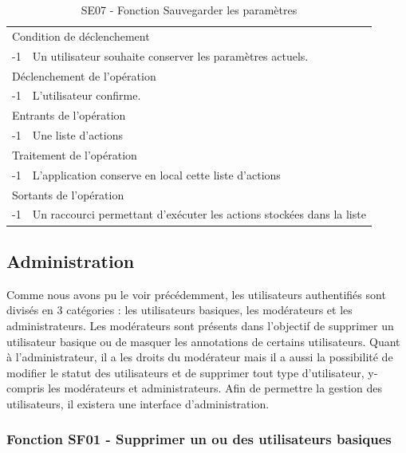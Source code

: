 \documentclass[a4paper]{article}
\begin{document}
\begin{table}[H]
  \centering
   \small
	\begin{tabular}{|c|p{12cm}|}
   		\hline
   			\rowcolor{lightgray}\multicolumn{2}{|c|}{\textbf{SE07 - Fonction Sauvegarder les paramètres}} \\
   		\hline
   			\multicolumn{2}{|l|}{Condition de d\'eclenchement} \\
   		\hline
   			-1 & Un utilisateur souhaite conserver les paramètres actuels. \\
   		\hline
   			\multicolumn{2}{|l|}{D\'eclenchement de l'op\'eration} \\
   		\hline
   			-1 & L'utilisateur confirme. \\
   		\hline
   			\multicolumn{2}{|l|}{Entrants de l'op\'eration} \\
   		\hline
        	-1 & Une liste d'actions \\ 	
        \hline
   			\multicolumn{2}{|l|}{Traitement de l'op\'eration} \\
  		\hline
   			-1 & L'application conserve en local cette liste d'actions \\
   		\hline
   			\multicolumn{2}{|l|}{Sortants de l'op\'eration} \\
   		\hline
   			-1 & Un raccourci permettant d'exécuter les actions stockées dans la liste \\
   		\hline
	\end{tabular}
  \caption{SE07 - Fonction Sauvegarder les paramètres}
  \normalsize
  \label{tab:visu_img_save_parameters}
\end{table}

\subsection{Administration}

Comme nous avons pu le voir précédemment, les utilisateurs authentifiés sont divisés en 3 catégories : les utilisateurs basiques, les modérateurs et les administrateurs. Les modérateurs sont présents dans l'objectif de supprimer un utilisateur basique ou de masquer les annotations de certains utilisateurs. Quant à l'administrateur, il a les droits du modérateur mais il a aussi la possibilité de modifier le statut des utilisateurs et de supprimer tout type d'utilisateur, y-compris les modérateurs et administrateurs. Afin de permettre la gestion des utilisateurs, il existera une interface d'administration.

\subsubsection{Fonction SF01 - Supprimer un ou des utilisateurs basiques}
\end{document}
